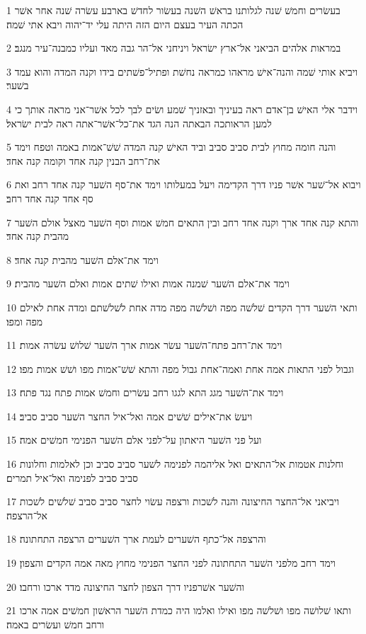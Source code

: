 \par 1 בעשׂרים וחמשׁ שׁנה לגלותנו בראשׁ השׁנה בעשׂור לחדשׁ בארבע עשׂרה שׁנה אחר אשׁר הכתה העיר בעצם היום הזה היתה עלי יד־יהוה ויבא אתי שׁמה׃
\par 2 במראות אלהים הביאני אל־ארץ ישׂראל ויניחני אל־הר גבה מאד ועליו כמבנה־עיר מנגב׃
\par 3 ויביא אותי שׁמה והנה־אישׁ מראהו כמראה נחשׁת ופתיל־פשׁתים בידו וקנה המדה והוא עמד בשׁער׃
\par 4 וידבר אלי האישׁ בן־אדם ראה בעיניך ובאזניך שׁמע ושׂים לבך לכל אשׁר־אני מראה אותך כי למען הראותכה הבאתה הנה הגד את־כל־אשׁר־אתה ראה לבית ישׂראל׃
\par 5 והנה חומה מחוץ לבית סביב סביב וביד האישׁ קנה המדה שׁשׁ־אמות באמה וטפח וימד את־רחב הבנין קנה אחד וקומה קנה אחד׃
\par 6 ויבוא אל־שׁער אשׁר פניו דרך הקדימה ויעל במעלותו וימד את־סף השׁער קנה אחד רחב ואת סף אחד קנה אחד רחב׃
\par 7 והתא קנה אחד ארך וקנה אחד רחב ובין התאים חמשׁ אמות וסף השׁער מאצל אולם השׁער מהבית קנה אחד׃
\par 8 וימד את־אלם השׁער מהבית קנה אחד׃
\par 9 וימד את־אלם השׁער שׁמנה אמות ואילו שׁתים אמות ואלם השׁער מהבית׃
\par 10 ותאי השׁער דרך הקדים שׁלשׁה מפה ושׁלשׁה מפה מדה אחת לשׁלשׁתם ומדה אחת לאילם מפה ומפו׃
\par 11 וימד את־רחב פתח־השׁער עשׂר אמות ארך השׁער שׁלושׁ עשׂרה אמות׃
\par 12 וגבול לפני התאות אמה אחת ואמה־אחת גבול מפה והתא שׁשׁ־אמות מפו ושׁשׁ אמות מפו׃
\par 13 וימד את־השׁער מגג התא לגגו רחב עשׂרים וחמשׁ אמות פתח נגד פתח׃
\par 14 ויעשׂ את־אילים שׁשׁים אמה ואל־איל החצר השׁער סביב סביב׃
\par 15 ועל פני השׁער היאתון על־לפני אלם השׁער הפנימי חמשׁים אמה׃
\par 16 וחלנות אטמות אל־התאים ואל אליהמה לפנימה לשׁער סביב סביב וכן לאלמות וחלונות סביב סביב לפנימה ואל־איל תמרים׃
\par 17 ויביאני אל־החצר החיצונה והנה לשׁכות ורצפה עשׂוי לחצר סביב סביב שׁלשׁים לשׁכות אל־הרצפה׃
\par 18 והרצפה אל־כתף השׁערים לעמת ארך השׁערים הרצפה התחתונה׃
\par 19 וימד רחב מלפני השׁער התחתונה לפני החצר הפנימי מחוץ מאה אמה הקדים והצפון׃
\par 20 והשׁער אשׁרפניו דרך הצפון לחצר החיצונה מדד ארכו ורחבו׃
\par 21 ותאו שׁלושׁה מפו ושׁלשׁה מפו ואילו ואלמו היה כמדת השׁער הראשׁון חמשׁים אמה ארכו ורחב חמשׁ ועשׂרים באמה׃
